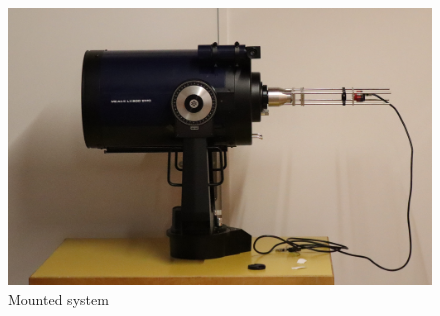 \begin{figure}[H]
    \centering
    \includegraphics[scale=0.1]{assets/figures/System/IMG_5308.JPG}
    \caption{Mounted system}
    \label{fig:GLOB_Syst}
\end{figure}